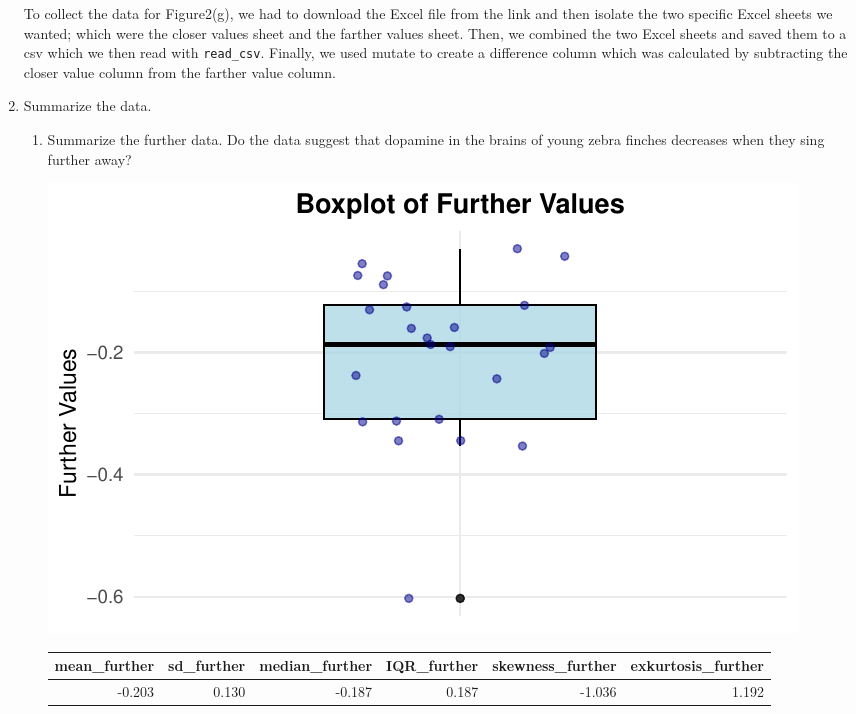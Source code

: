 \documentclass{article}\usepackage[]{graphicx}\usepackage[]{xcolor}
\makeatletter
\def\maxwidth{ %
  \ifdim\Gin@nat@width>\linewidth
    \linewidth
  \else
    \Gin@nat@width
  \fi
}
\newenvironment{knitrout}{}{} %
\makeatother
\begin{document}
\begin{enumerate}
To collect the data for Figure2(g), we had to download the Excel file from the link 
and then isolate the two specific Excel sheets we wanted; which 
were the closer values sheet and the farther values sheet. 
Then, we combined the two Excel sheets and saved them to a csv
which we then read with \verb|read_csv|.
Finally, we used mutate to create a difference column which was calculated
by subtracting the closer value column from the farther value column.
\newpage
\item Summarize the data.
\begin{enumerate}
  \item Summarize the further data. Do the data suggest that
   dopamine in the brains of young zebra finches decreases when
   they sing further away?
\begin{knitrout}
\color{fgcolor}

{\centering \includegraphics[width=\maxwidth]{figure/unnamed-chunk-3-1} 

}


\end{knitrout}
\begin{table}[ht]
\centering
\begin{tabular}{rrrrrr}
  \hline
mean\_further & sd\_further & median\_further & IQR\_further & skewness\_further & exkurtosis\_further \\ 
  \hline
-0.203 & 0.130 & -0.187 & 0.187 & -1.036 & 1.192 \\ 
   \hline
\end{tabular}
\end{table}


\end{enumerate}
\end{enumerate}
\end{document}
